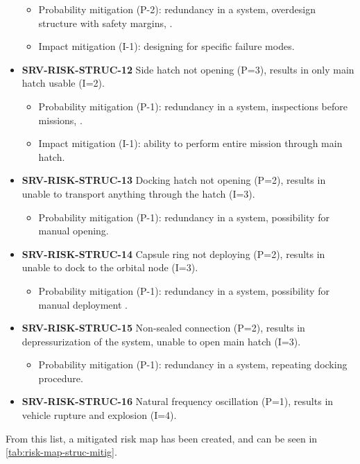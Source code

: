 \begin{itemize}
\begin{itemize}
		 \item Probability mitigation (P-2): redundancy in a system, overdesign structure with safety margins, .		 \item Impact mitigation (I-1): designing for specific failure modes.	\end{itemize}
	 \item \textbf{SRV-RISK-STRUC-12} Side hatch not opening (P=3), results in only main hatch usable (I=2).
	\begin{itemize}
		 \item Probability mitigation (P-1): redundancy in a system, inspections before missions, .		 \item Impact mitigation (I-1): ability to perform entire mission through main hatch.	\end{itemize}
	 \item \textbf{SRV-RISK-STRUC-13} Docking hatch not opening (P=2), results in unable to transport anything through the hatch (I=3).
	\begin{itemize}
		 \item Probability mitigation (P-1): redundancy in a system, possibility for manual opening.	\end{itemize}
	 \item \textbf{SRV-RISK-STRUC-14} Capsule ring not deploying (P=2), results in unable to dock to the orbital node (I=3).
	\begin{itemize}
		 \item Probability mitigation (P-1): redundancy in a system, possibility for manual deployment .	\end{itemize}
	 \item \textbf{SRV-RISK-STRUC-15} Non-sealed connection (P=2), results in depressurization of the system, unable to open main hatch (I=3).
	\begin{itemize}
		 \item Probability mitigation (P-1): redundancy in a system, repeating docking procedure.	\end{itemize}
	 \item \textbf{SRV-RISK-STRUC-16} Natural frequency oscillation (P=1), results in vehicle rupture and explosion (I=4).
\end{itemize}

\noindent From this list, a mitigated risk map has been created, and can be seen in \autoref{tab:risk-map-struc-mitig}.

